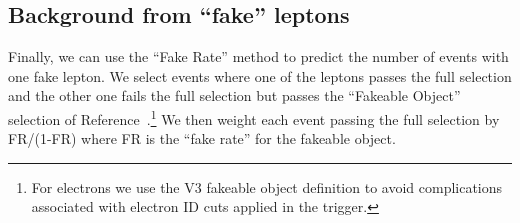 






\subsection{Background from ``fake'' leptons}
\label{sec:bgfake}

Finally, we can use the ``Fake Rate'' method\cite{ref:FR} 
to predict 
the number of events with one fake lepton. We select
events where one of the leptons passes the full selection and 
the other one fails the full selection but passes the 
``Fakeable Object'' selection of 
Reference~\cite{ref:FR}.\footnote{For electrons we use
the V3 fakeable object definition to avoid complications 
associated with electron ID cuts applied in the trigger.} 
We then weight each event passing the full selection
by FR/(1-FR) where FR is the ``fake rate'' for the 
fakeable object.  

